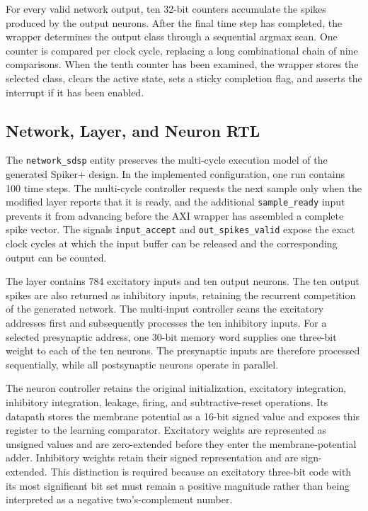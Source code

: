 For every valid network output, ten 32-bit counters accumulate the spikes produced by the output neurons. After the final time step has completed, the wrapper determines the output class through a sequential argmax scan. One counter is compared per clock cycle, replacing a long combinational chain of nine comparisons. When the tenth counter has been examined, the wrapper stores the selected class, clears the active state, sets a sticky completion flag, and asserts the interrupt if it has been enabled.

\subsection{Network, Layer, and Neuron RTL}

The \texttt{network\_sdsp} entity preserves the multi-cycle execution model of the generated Spiker+ design. In the implemented configuration, one run contains 100 time steps. The multi-cycle controller requests the next sample only when the modified layer reports that it is ready, and the additional \texttt{sample\_ready} input prevents it from advancing before the AXI wrapper has assembled a complete spike vector. The signals \texttt{input\_accept} and \texttt{out\_spikes\_valid} expose the exact clock cycles at which the input buffer can be released and the corresponding output can be counted.

The layer contains 784 excitatory inputs and ten output neurons. The ten output spikes are also returned as inhibitory inputs, retaining the recurrent competition of the generated network. The multi-input controller scans the excitatory addresses first and subsequently processes the ten inhibitory inputs. For a selected presynaptic address, one 30-bit memory word supplies one three-bit weight to each of the ten neurons. The presynaptic inputs are therefore processed sequentially, while all postsynaptic neurons operate in parallel.

The neuron controller retains the original initialization, excitatory integration, inhibitory integration, leakage, firing, and subtractive-reset operations. Its datapath stores the membrane potential as a 16-bit signed value and exposes this register to the learning comparator. Excitatory weights are represented as unsigned values and are zero-extended before they enter the membrane-potential adder. Inhibitory weights retain their signed representation and are sign-extended. This distinction is required because an excitatory three-bit code with its most significant bit set must remain a positive magnitude rather than being interpreted as a negative two's-complement number.

